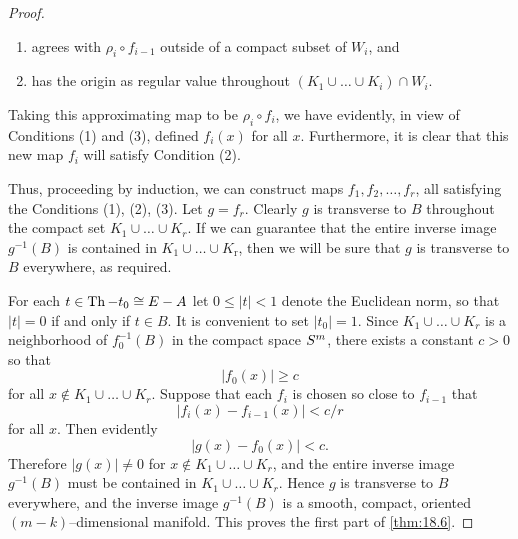 \documentclass[../main]{subfiles}
\begin{document}
\begin{proof}
\begin{enumerate}[label=(\alph*)]
    \item agrees with $\rho_i \circ f_{i - 1}$ outside of a compact subset of $W_i$, and
    \item has the origin as regular value throughout $(K_1 \cup \ldots \cup K_i) \cap W_i$.
\end{enumerate}

Taking this approximating map to be $\rho_i \circ f_i$, we have evidently, in view of Conditions (1) and (3), defined $f_i(x)$ for all $x$. Furthermore, it is clear that this new map $f_i$ will satisfy Condition (2). 

Thus, proceeding by induction, we can construct maps $f_1, f_2, \ldots, f_r$, all satisfying the Conditions (1), (2), (3). Let $g = f_r$. Clearly $g$ is transverse to $B$ throughout the compact set $K_{1} \cup \ldots \cup K_{r}$. If we can guarantee that the entire inverse image $g^{-1}(B)$ is contained in $K_{1} \cup \ldots \cup K_{\mathrm{r}}$, then we will be sure that $g$ is transverse to $B$ everywhere, as required.

For each $t \in \operatorname{Th} - t_0 \cong E - A$ let $0 \le |t| < 1$ denote the Euclidean norm, so that $|t| = 0$ if and only if $t \in B$. It is convenient to set $|t_0| = 1$. Since $K_1 \cup \ldots \cup K_r$ is a neighborhood of $f_0^{-1}(B)$ in the compact space $S^m$, there exists a constant $c > 0$ so that \[|f_0(x)| \ge c\] for all $x \not \in K_1 \cup \ldots \cup K_r$. Suppose that each $f_i$ is chosen so close to $f_{i - 1}$ that \[|f_i(x) - f_{i - 1}(x)| < c/r\] for all $x$. Then evidently \[|g(x) - f_0(x)| < c.\] Therefore $|g(x)| \ne 0$ for $x \not \in K_1 \cup \ldots \cup K_r$, and the entire inverse image $g^{-1}(B)$ must be contained in $K_1 \cup \ldots \cup K_r$. Hence $g$ is transverse to $B$ everywhere, and the inverse image $g^{-1}(B)$ is a smooth, compact, oriented $(m - k)$--dimensional manifold. This proves the first part of \ref{thm:18.6}. 


\end{proof}
\end{document}
